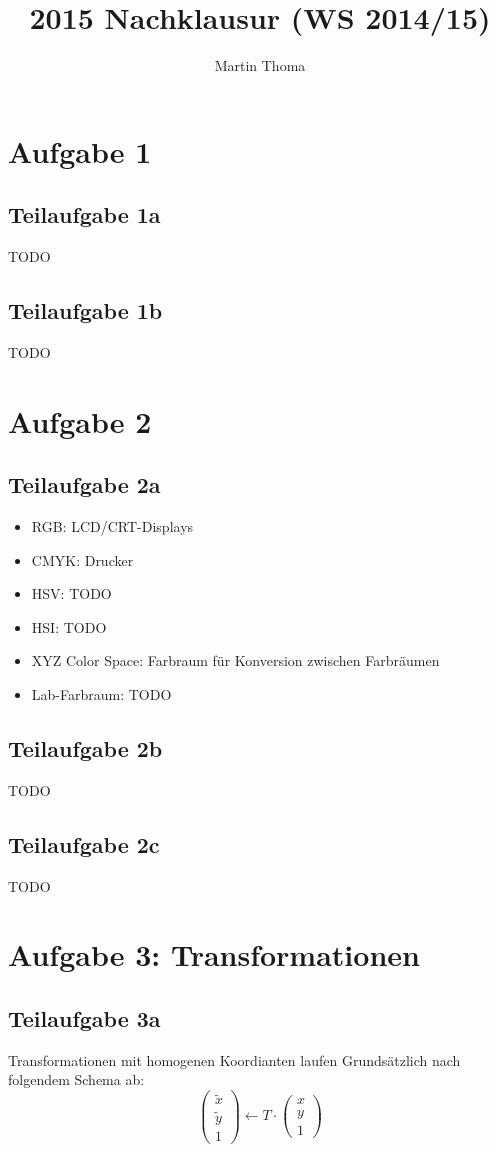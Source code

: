\documentclass[a4paper]{scrartcl}
\begin{document}
\title{2015 Nachklausur (WS 2014/15)}
\author{Martin Thoma}

\setcounter{section}{1}
\section*{Aufgabe 1}
\subsection*{Teilaufgabe 1a}
TODO
\subsection*{Teilaufgabe 1b}
TODO

\section*{Aufgabe 2}
\subsection*{Teilaufgabe 2a}

\begin{itemize}
    \item RGB: LCD/CRT-Displays
    \item CMYK: Drucker
    \item HSV: TODO
    \item HSI: TODO
    \item XYZ Color Space: Farbraum für Konversion zwischen Farbräumen
    \item Lab-Farbraum: TODO
\end{itemize}

\subsection*{Teilaufgabe 2b}
TODO

\subsection*{Teilaufgabe 2c}
TODO

\section*{Aufgabe 3: Transformationen}
\subsection*{Teilaufgabe 3a}
Transformationen mit homogenen Koordianten laufen Grundsätzlich nach folgendem Schema ab:
\[\begin{pmatrix}\tilde{x}\\ \tilde{y} \\ 1\end{pmatrix} \gets T \cdot \begin{pmatrix}x\\ y \\ 1\end{pmatrix}\]
\end{document}
